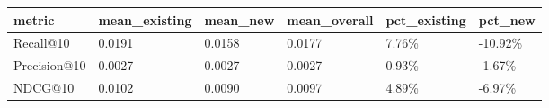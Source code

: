 \begin{tabular}{llllll}
\toprule
metric & mean_existing & mean_new & mean_overall & pct_existing & pct_new \\
\midrule
Recall@10 & 0.0191 & 0.0158 & 0.0177 & 7.76\% & -10.92\% \\
Precision@10 & 0.0027 & 0.0027 & 0.0027 & 0.93\% & -1.67\% \\
NDCG@10 & 0.0102 & 0.0090 & 0.0097 & 4.89\% & -6.97\% \\
\bottomrule
\end{tabular}
